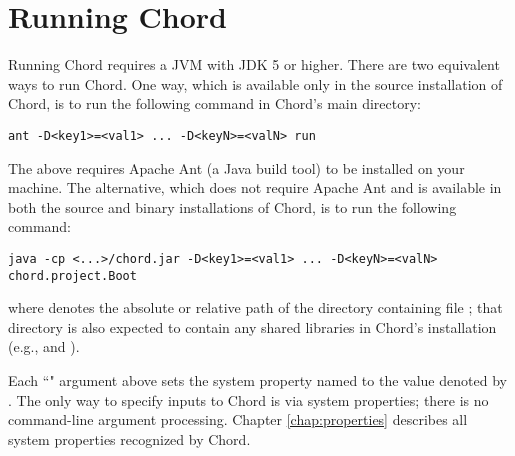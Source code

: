 \section{Running Chord}
\label{sec:running-chord}

Running Chord requires a JVM with JDK 5 or higher.
There are two equivalent ways to run Chord.
One way, which is available only in the source installation of Chord, is to run the
following command in Chord's main directory:

\begin{framed}
\begin{verbatim}
ant -D<key1>=<val1> ... -D<keyN>=<valN> run
\end{verbatim}
\end{framed}

The above requires Apache Ant (a Java build tool) to be installed on
your machine.  The alternative, which does not require Apache Ant and is
available in both the source and binary installations of Chord, is
to run the following command:

\begin{framed}
\begin{verbatim}
java -cp <...>/chord.jar -D<key1>=<val1> ... -D<keyN>=<valN> chord.project.Boot
\end{verbatim}
\end{framed}

where  denotes the absolute or relative path of the
directory containing file ; that directory is also
expected to contain any shared libraries in Chord's installation (e.g.,
 and ).

Each ``" argument above sets the system property
named  to the value denoted by .  The only
way to specify inputs to Chord is via system properties; there is no
command-line argument processing.  Chapter \ref{chap:properties}
describes all system properties recognized by Chord.

